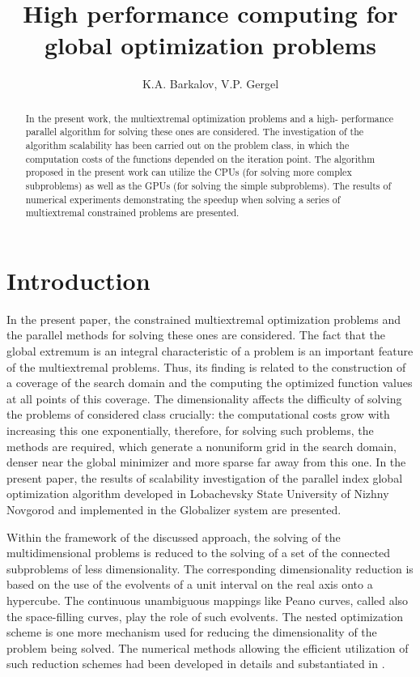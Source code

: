 \documentclass[a4paper]{jpconf}
\begin{document}
\title{High performance computing for global optimization problems}


\author{K.A. Barkalov, V.P. Gergel}

\address{National Research Lobachevsky State University of Nizhny Novgorod, Gagarin avenue 23, 
Nizhny Novgorod, Russia, 603950}



\begin{abstract}
In the present work, the multiextremal optimization problems and a high-
performance parallel algorithm for solving these ones are considered. The 
investigation of the algorithm scalability has been carried out on the 
problem class, in which the computation costs of the functions depended on 
the iteration point. The algorithm proposed in the present work can utilize 
the CPUs (for solving more complex subproblems) as well as the GPUs (for 
solving the simple subproblems). The results of numerical experiments 
demonstrating the speedup when solving a series of multiextremal constrained 
problems are presented.
\end{abstract}

\section{Introduction}
In the present paper, the constrained multiextremal optimization problems and 
the parallel methods for solving these ones are considered. The fact that the 
global extremum is an integral characteristic of a problem is an important 
feature of the multiextremal problems. Thus, its finding is related to the 
construction of a coverage of the search domain and the computing the 
optimized function values at all points of this coverage. The dimensionality 
affects the difficulty of solving the problems of considered class crucially: 
the computational costs grow with increasing this one exponentially, 
therefore, for solving such problems, the methods are required, which 
generate a nonuniform grid in the search domain, denser near the 
global minimizer and more sparse far away from this one. In the 
present paper, the results of scalability investigation of the parallel 
index global optimization algorithm developed in Lobachevsky State 
University of Nizhny Novgorod \cite{Strongin2000,Strongin2013} and implemented in the Globalizer 
system \cite{Globalizer,Globalizer1} are presented.

Within the framework of the discussed approach, the solving of the 
multidimensional problems is reduced to the solving of a set of the connected 
subproblems of less dimensionality. The corresponding dimensionality 
reduction is based on the use of the evolvents of a unit interval on the real 
axis onto a hypercube. The continuous unambiguous mappings like Peano curves, 
called also the space-filling curves, play the role of such evolvents. 
The nested optimization scheme is one more mechanism used for reducing the 
dimensionality of the problem being solved. The numerical methods allowing 
the efficient utilization of such reduction schemes had been developed 
in details and substantiated in \cite{Strongin2000,Strongin2013}.
\end{document}
